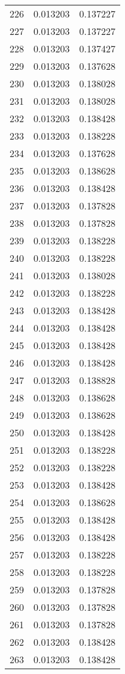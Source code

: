 \begin{longtable}{rrr}
226 & 0.013203 & 0.137227 \\
227 & 0.013203 & 0.137227 \\
228 & 0.013203 & 0.137427 \\
229 & 0.013203 & 0.137628 \\
230 & 0.013203 & 0.138028 \\
231 & 0.013203 & 0.138028 \\
232 & 0.013203 & 0.138428 \\
233 & 0.013203 & 0.138228 \\
234 & 0.013203 & 0.137628 \\
235 & 0.013203 & 0.138628 \\
236 & 0.013203 & 0.138428 \\
237 & 0.013203 & 0.137828 \\
238 & 0.013203 & 0.137828 \\
239 & 0.013203 & 0.138228 \\
240 & 0.013203 & 0.138228 \\
241 & 0.013203 & 0.138028 \\
242 & 0.013203 & 0.138228 \\
243 & 0.013203 & 0.138428 \\
244 & 0.013203 & 0.138428 \\
245 & 0.013203 & 0.138428 \\
246 & 0.013203 & 0.138428 \\
247 & 0.013203 & 0.138828 \\
248 & 0.013203 & 0.138628 \\
249 & 0.013203 & 0.138628 \\
250 & 0.013203 & 0.138428 \\
251 & 0.013203 & 0.138228 \\
252 & 0.013203 & 0.138228 \\
253 & 0.013203 & 0.138428 \\
254 & 0.013203 & 0.138628 \\
255 & 0.013203 & 0.138428 \\
256 & 0.013203 & 0.138428 \\
257 & 0.013203 & 0.138228 \\
258 & 0.013203 & 0.138228 \\
259 & 0.013203 & 0.137828 \\
260 & 0.013203 & 0.137828 \\
261 & 0.013203 & 0.137828 \\
262 & 0.013203 & 0.138428 \\
263 & 0.013203 & 0.138428 \\

\end{longtable}
